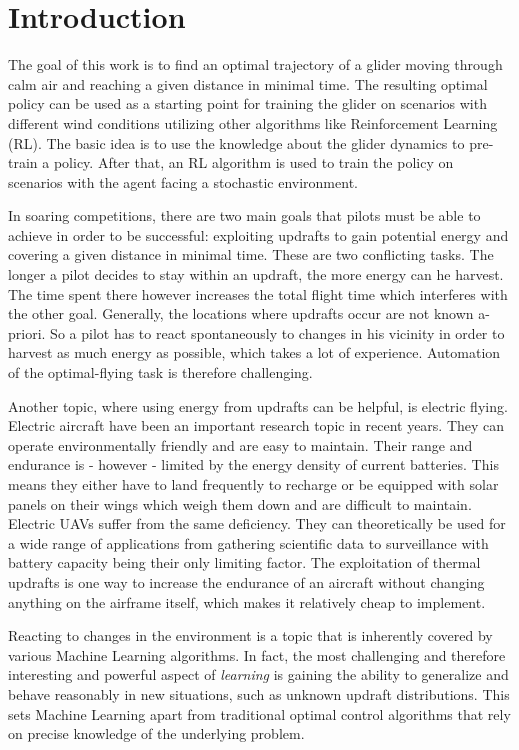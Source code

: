 
\chapter{Introduction}

The goal of this work is to find an optimal trajectory of a glider moving through calm air and reaching a given distance in minimal time. The resulting optimal policy can be used as a starting point for training the glider on scenarios with different wind conditions utilizing other algorithms like Reinforcement Learning (RL). The basic idea is to use the knowledge about the glider dynamics to pre-train a policy. After that, an RL algorithm is used to train the policy on scenarios with the agent facing a stochastic environment.

In soaring competitions, there are two main goals that pilots must be able to achieve in order to be successful: exploiting updrafts to gain potential energy and covering a given distance in minimal time. These are two conflicting tasks. The longer a pilot decides to stay within an updraft, the more energy can he harvest. The time spent there however increases the total flight time which interferes with the other goal. Generally, the locations where updrafts occur are not known a-priori. So a pilot has to react spontaneously to changes in his vicinity in order to harvest as much energy as possible, which takes a lot of experience. Automation of the optimal-flying task is therefore challenging.

Another topic, where using energy from updrafts can be helpful, is electric flying. Electric aircraft have been an important research topic in recent years. They can operate environmentally friendly and are easy to maintain. Their range and endurance is - however - limited by the energy density of current batteries. This means they either have to land frequently to recharge or be equipped with solar panels on their wings which weigh them down and are difficult to maintain. Electric UAVs suffer from the same deficiency. They can theoretically be used for a wide range of applications from gathering scientific data to surveillance with battery capacity being their only limiting factor. The exploitation of thermal updrafts is one way to increase the endurance of an aircraft without changing anything on the airframe itself, which makes it relatively cheap to implement.

Reacting to changes in the environment is a topic that is inherently covered by various Machine Learning algorithms. In fact, the most challenging and therefore interesting and powerful aspect of \textit{learning} is gaining the ability to generalize and behave reasonably in new situations, such as unknown updraft distributions. This sets Machine Learning apart from traditional optimal control algorithms that rely on precise knowledge of the underlying problem.

